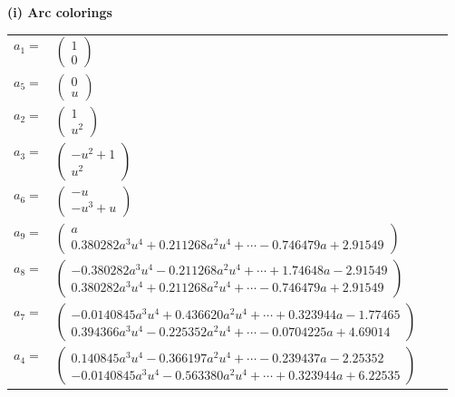 \documentclass[1p]{elsarticle_modified}
\theoremstyle{definition}
\begin{document}
\flushleft \textbf{(i) Arc colorings}\\
\begin{tabular}{m{7pt} m{180pt} m{7pt} m{180pt} }
\flushright $a_{1}=$&$\begin{pmatrix}1\\0\end{pmatrix}$ \\
\flushright $a_{5}=$&$\begin{pmatrix}0\\u\end{pmatrix}$ \\
\flushright $a_{2}=$&$\begin{pmatrix}1\\u^2\end{pmatrix}$ \\
\flushright $a_{3}=$&$\begin{pmatrix}- u^2+1\\u^2\end{pmatrix}$ \\
\flushright $a_{6}=$&$\begin{pmatrix}- u\\- u^3+u\end{pmatrix}$ \\
\flushright $a_{9}=$&$\begin{pmatrix}a\\0.380282 a^{3} u^{4}+0.211268 a^{2} u^{4}+\cdots-0.746479 a+2.91549\end{pmatrix}$ \\
\flushright $a_{8}=$&$\begin{pmatrix}-0.380282 a^{3} u^{4}-0.211268 a^{2} u^{4}+\cdots+1.74648 a-2.91549\\0.380282 a^{3} u^{4}+0.211268 a^{2} u^{4}+\cdots-0.746479 a+2.91549\end{pmatrix}$ \\
\flushright $a_{7}=$&$\begin{pmatrix}-0.0140845 a^{3} u^{4}+0.436620 a^{2} u^{4}+\cdots+0.323944 a-1.77465\\0.394366 a^{3} u^{4}-0.225352 a^{2} u^{4}+\cdots-0.0704225 a+4.69014\end{pmatrix}$ \\
\flushright $a_{4}=$&$\begin{pmatrix}0.140845 a^{3} u^{4}-0.366197 a^{2} u^{4}+\cdots-0.239437 a-2.25352\\-0.0140845 a^{3} u^{4}-0.563380 a^{2} u^{4}+\cdots+0.323944 a+6.22535\end{pmatrix}$ \\

\end{tabular}
\end{document}
